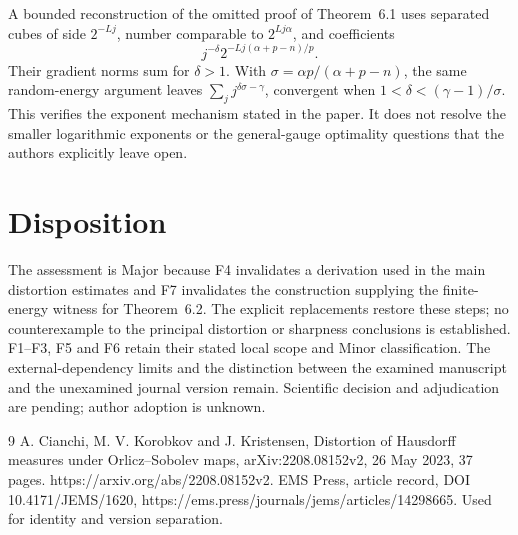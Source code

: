 \documentclass[10pt]{article}
\begin{document}
A bounded reconstruction of the omitted proof of Theorem 6.1 uses separated cubes of side \(2^{-Lj}\), number comparable to \(2^{Lj\alpha}\), and coefficients \[j^{-\delta}2^{-Lj(\alpha+p-n)/p}.\] Their gradient norms sum for \(\delta>1\). With \(\sigma=\alpha p/(\alpha+p-n)\), the same random-energy argument leaves \(\sum_jj^{\delta\sigma-\gamma}\), convergent when \(1<\delta<(\gamma-1)/\sigma\). This verifies the exponent mechanism stated in the paper. It does not resolve the smaller logarithmic exponents or the general-gauge optimality questions that the authors explicitly leave open.\par
\section*{Disposition}
The assessment is Major because F4 invalidates a derivation used in the main distortion estimates and F7 invalidates the construction supplying the finite-energy witness for Theorem 6.2. The explicit replacements restore these steps; no counterexample to the principal distortion or sharpness conclusions is established. F1–F3, F5 and F6 retain their stated local scope and Minor classification. The external-dependency limits and the distinction between the examined manuscript and the unexamined journal version remain. Scientific decision and adjudication are pending; author adoption is unknown.\par
9 A. Cianchi, M. V. Korobkov and J. Kristensen, Distortion of Hausdorff measures under Orlicz–Sobolev maps, arXiv:2208.08152v2, 26 May 2023, 37 pages. https://arxiv.org/abs/2208.08152v2. EMS Press, article record, DOI 10.4171/JEMS/1620, https://ems.press/journals/jems/articles/14298665. Used for identity and version separation.\par
\end{document}
